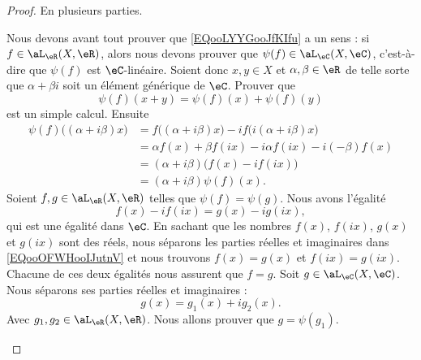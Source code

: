 \begin{proof}
	En plusieurs parties.
	\begin{subproof}
		Nous devons avant tout prouver que \eqref{EQooLYYGooJfKIfu} a un sens : si \( f\in \aL_{\eR}(X,\eR)\), alors nous devons prouver que \( \psi(f)\in\aL_\eC(X,\eC)\), c'est-à-dire que \( \psi(f)\) est \( \eC\)-linéaire. Soient donc \( x,y\in X\) et \( \alpha,\beta\in \eR\) de telle sorte que \( \alpha+\beta i\) soit un élément générique de \( \eC\). Prouver que
		\begin{equation}
			\psi(f)(x+y)=\psi(f)(x)+\psi(f)(y)
		\end{equation}
		est un simple calcul. Ensuite
		\begin{subequations}
			\begin{align}
				\psi(f)\big( (\alpha+i\beta)x \big) & =f\big( (\alpha+i\beta)x \big)-if\big( i(\alpha+i\beta)x \big) \\
				                                    & =\alpha f(x)+\beta f(ix)-i\alpha f(ix)-i(-\beta)f(x)           \\
				                                    & =(\alpha+i\beta)\big( f(x)-if(ix) \big)                        \\
				                                    & =(\alpha+i\beta)\psi(f)(x).
			\end{align}
		\end{subequations}
		Soient \( f,g\in \aL_{\eR}(X,\eR)\) telles que \( \psi(f)=\psi(g)\). Nous avons l'égalité
		\begin{equation}        \label{EQooOFWHooIJutnV}
			f(x)-if(ix)=g(x)-ig(ix),
		\end{equation}
		qui est une égalité dans \( \eC\). En sachant que les nombres \( f(x)\), \( f(ix)\), \( g(x)\) et \( g(ix)\) sont des réels, nous séparons les parties réelles et imaginaires dans \eqref{EQooOFWHooIJutnV} et nous trouvons \( f(x)=g(x)\) et \( f(ix)=g(ix)\). Chacune de ces deux égalités nous assurent que \( f=g\).
		Soit \( g\in \aL_{\eC}(X,\eC)\). Nous séparons ses parties réelles et imaginaires :
		\begin{equation}
			g(x)=g_1(x)+ig_2(x).
		\end{equation}
		Avec \( g_1,g_2\in \aL_{\eR}(X,\eR)\). Nous allons prouver que \( g=\psi(g_1)\).


\end{subproof}
\end{proof}
